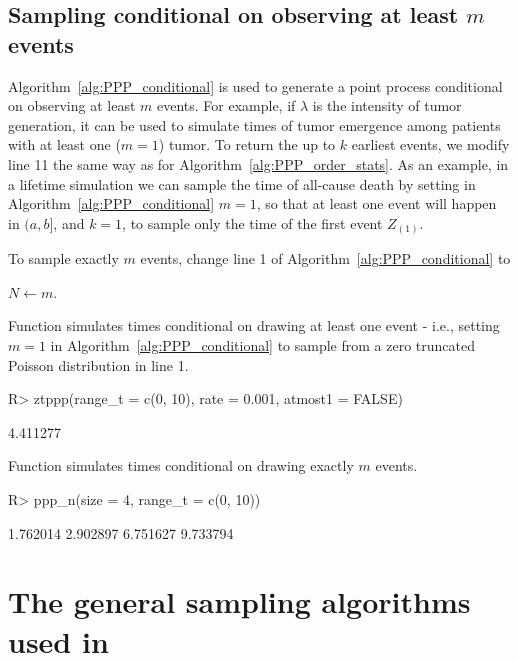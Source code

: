 \documentclass[article]{jss}\usepackage[]{graphicx}\usepackage[]{xcolor}
\newcommand{\fct}[1]{\code{#1()}}
\begin{document}
\subsection{Sampling conditional on observing at least $m$ events}\label{sec:PPP_cond_sampling}



Algorithm~\ref{alg:PPP_conditional} is used to generate a point process conditional on observing at least $m$ events. For example, if $\lambda$ is the intensity of tumor generation, it can be used to simulate times of tumor emergence among patients with at least one ($m=1$) tumor. To return the up to $k$ earliest events, we modify line 11 the same way as for Algorithm~\ref{alg:PPP_order_stats}. As an example, in a lifetime simulation we can sample the time of all-cause death by setting in Algorithm~\ref{alg:PPP_conditional} $m=1$, so that at least one event will happen in $(a, b]$, and $k = 1$, to sample only the time of the first event $Z_{(1)}$.

To sample exactly $m$ events, change line 1 of Algorithm~\ref{alg:PPP_conditional} to
\begin{center}
$N \gets m$.
\end{center}

Function \fct{ztppp} simulates times conditional on drawing at least one event - i.e., setting $m=1$ in Algorithm~\ref{alg:PPP_conditional} to sample from a zero truncated Poisson distribution in line 1.
\begin{Schunk}
\begin{Sinput}
R> ztppp(range_t = c(0, 10), rate = 0.001, atmost1 = FALSE)
\end{Sinput}
\begin{Soutput}
[1] 4.411277
\end{Soutput}
\end{Schunk}

Function \fct{ppp\_n} simulates times conditional on drawing exactly $m$ events.
\begin{Schunk}
\begin{Sinput}
R> ppp_n(size = 4, range_t = c(0, 10))
\end{Sinput}
\begin{Soutput}
[1] 1.762014 2.902897 6.751627 9.733794
\end{Soutput}
\end{Schunk}

\section[The general sampling algorithms used in nhppp]{The general sampling algorithms used in }\label{sec:general-sampling}
\end{document}
